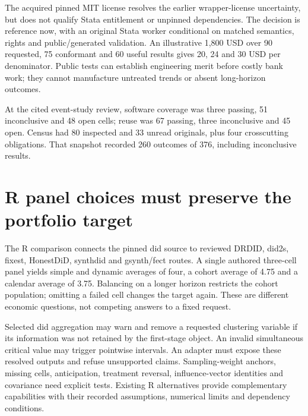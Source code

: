 The acquired pinned MIT license resolves the earlier wrapper-license
uncertainty, but does not qualify Stata entitlement or unpinned
dependencies. The decision is reference now, with an original Stata
worker conditional on matched semantics, rights and public/generated
validation. An illustrative 1,800 USD over 90 requested, 75 conformant
and 60 useful results gives 20, 24 and 30 USD per denominator. Public
tests can establish engineering merit before costly bank work; they
cannot manufacture untreated trends or absent long-horizon outcomes.
\citep{exec24_eventstudy_sources,exec24_eventstudy_contract}

At the cited event-study review, software coverage was three passing, 51
inconclusive and 48 open cells; reuse was 67 passing, three inconclusive
and 45 open. Census had 80 inspected and 33 unread originals, plus four
crosscutting obligations. That snapshot recorded 260 outcomes of 376,
including inconclusive results.
\citep{sp24eventstudy_reader,sp24eventstudy_progress}

\hypertarget{r-panel-choices-must-preserve-the-portfolio-target}{%
\section{R panel choices must preserve the portfolio
target}\label{r-panel-choices-must-preserve-the-portfolio-target}}

The R comparison connects the pinned did source to reviewed DRDID,
did2s, fixest, HonestDiD, synthdid and gsynth/fect routes. A single
authored three-cell panel yields simple and dynamic averages of four, a
cohort average of 4.75 and a calendar average of 3.75. Balancing on a
longer horizon restricts the cohort population; omitting a failed cell
changes the target again. These are different economic questions, not
competing answers to a fixed request.
\citep{exec24_panelr_did,exec24_panelr_contract}

Selected did aggregation may warn and remove a requested clustering
variable if its information was not retained by the first-stage object.
An invalid simultaneous critical value may trigger pointwise intervals.
An adapter must expose these resolved outputs and refuse unsupported
claims. Sampling-weight anchors, missing cells, anticipation, treatment
reversal, influence-vector identities and covariance need explicit
tests. Existing R alternatives provide complementary capabilities with
their recorded assumptions, numerical limits and dependency conditions.
\citep{exec24_panelr_did,exec24_panelr_contract}

